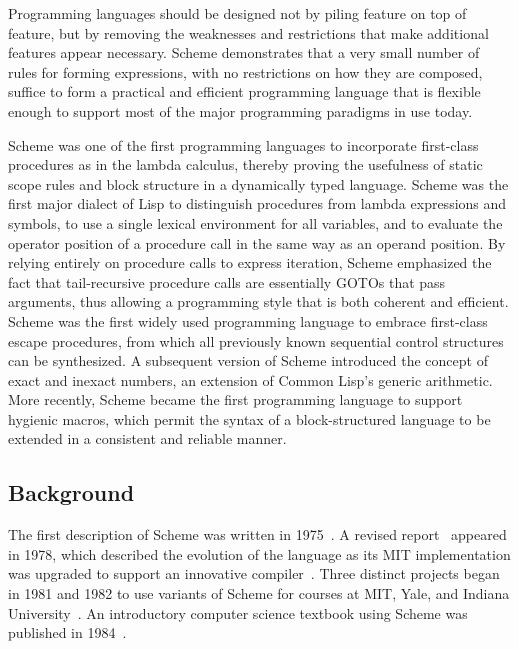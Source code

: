 

\label{historysection}

Programming languages should be designed not by piling feature on top of
feature, but by removing the weaknesses and restrictions that make additional
features appear necessary.  Scheme demonstrates that a very small number
of rules for forming expressions, with no restrictions on how they are
composed, suffice to form a practical and efficient programming language
that is flexible enough to support most of the major programming
paradigms in use today.

Scheme
was one of the first programming languages to incorporate first-class
procedures as in the lambda calculus, thereby proving the usefulness of
static scope rules and block structure in a dynamically typed language.
Scheme was the first major dialect of Lisp to distinguish procedures
from lambda expressions and symbols, to use a single lexical
environment for all variables, and to evaluate the operator position
of a procedure call in the same way as an operand position.  By relying
entirely on procedure calls to express iteration, Scheme emphasized the
fact that tail-recursive procedure calls are essentially GOTOs that
pass arguments, thus allowing a programming style that is both coherent
and efficient.  Scheme was the first widely used programming language to
embrace first-class escape procedures, from which all previously known
sequential control structures can be synthesized.  A subsequent
version of Scheme introduced the concept of exact and inexact numbers,
an extension of Common Lisp's generic arithmetic.
More recently, Scheme became the first programming language to support
hygienic macros, which permit the syntax of a block-structured language
to be extended in a consistent and reliable manner.

\subsection*{Background}

\vest The first description of Scheme was written in
1975~\cite{Scheme75}.  A revised report~\cite{Scheme78}
appeared in 1978, which described the evolution
of the language as its MIT implementation was upgraded to support an
innovative compiler~\cite{Rabbit}.  Three distinct projects began in
1981 and 1982 to use variants of Scheme for courses at MIT, Yale, and
Indiana University~\cite{Rees82,MITScheme,Scheme311}.  An introductory
computer science textbook using Scheme was published in
1984~\cite{SICP}.

